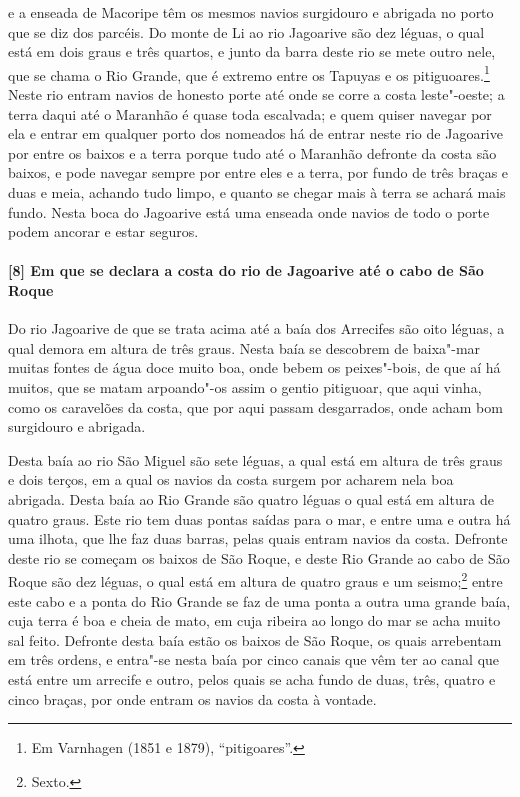 \begin{linenumbers}
e a enseada de Macoripe têm os mesmos navios surgidouro e abrigada no porto que se diz dos
parcéis. Do monte de Li ao rio Jagoarive são dez léguas, o qual está em dois graus e três
quartos, e junto da barra deste rio se mete outro nele, que se chama o Rio Grande, que é
extremo entre os Tapuyas e os pitiguoares.\footnote{ Em Varnhagen (1851 e 1879),
``pitigoares''.} Neste rio entram navios de honesto porte até onde se corre a costa
leste"-oeste; a terra daqui até o Maranhão é quase toda escalvada; e quem quiser navegar
por ela e entrar em qualquer porto dos nomeados há de entrar neste rio de Jagoarive por
entre os baixos e a terra porque tudo até o Maranhão defronte da costa são baixos, e pode
navegar sempre por entre eles e a terra, por fundo de três braças e duas e meia, achando
tudo limpo, e quanto se chegar mais à terra se achará mais fundo. Nesta boca do Jagoarive
está uma enseada onde navios de todo o porte podem ancorar e estar seguros.

\paragraph{[8] Em que se declara a costa do rio de Jagoarive até o cabo de São Roque} \quad
Do rio Jagoarive de que se trata acima até a baía dos Arrecifes são oito léguas, a qual
demora em altura de três graus. Nesta baía se descobrem de baixa"-mar muitas fontes de água
doce muito boa, onde bebem os peixes"-bois, de que aí há muitos, que se matam arpoando"-os
assim o gentio pitiguoar, que aqui vinha, como os caravelões da costa, que por aqui passam
desgarrados, onde acham bom surgidouro e abrigada.

Desta baía ao rio São Miguel são sete léguas, a qual está em altura de três graus e dois
terços, em a qual os navios da costa surgem por acharem nela boa abrigada. Desta baía ao
Rio Grande são quatro léguas o qual está em altura de quatro graus. Este rio tem duas
pontas saídas para o mar, e entre uma e outra há uma ilhota, que lhe faz duas barras,
pelas quais entram navios da costa. Defronte deste rio se começam os baixos de São Roque,
e deste Rio Grande ao cabo de São Roque são dez léguas, o qual está em altura de quatro
graus e um seismo;\footnote{ Sexto.} entre este cabo e a ponta do Rio Grande se faz de uma
ponta a outra uma grande baía, cuja terra é boa e cheia de mato, em cuja ribeira ao longo
do mar se acha muito sal feito. Defronte desta baía estão os baixos de São Roque, os quais
arrebentam em três ordens, e entra"-se nesta baía por cinco canais que vêm ter ao canal que
está entre um arrecife e outro, pelos quais se acha fundo de duas, três, quatro e cinco
braças, por onde entram os navios da costa à vontade.


\end{linenumbers}
